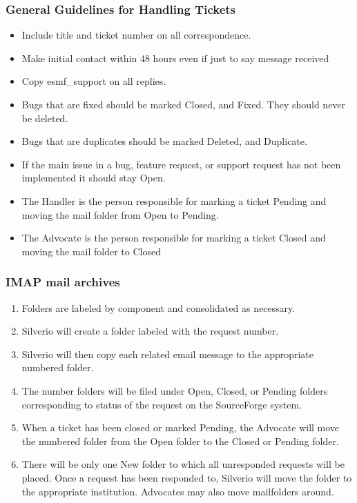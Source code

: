 \subsubsection{General Guidelines for Handling Tickets}
\begin{itemize}
\item Include title and ticket number on all correspondence.
\item Make initial contact within 48 hours even if just to say message received
\item Copy esmf\_support on all replies.
\item Bugs that are fixed should be marked Closed, and Fixed. They should never be deleted. 
\item Bugs that are duplicates should be marked Deleted, and Duplicate. 
\item If the main issue in a bug, feature request, or support request has not been implemented it should stay Open.
\item The Handler is the person responsible for marking a ticket Pending and moving the mail folder from Open to Pending.
\item The Advocate is the person responsible for marking a ticket Closed and moving the mail folder to Closed
\end{itemize}

\subsubsection{IMAP mail archives}
\begin{enumerate}
\item Folders are labeled by component and consolidated as necessary.
\item Silverio will create a folder labeled with the request number. 
\item Silverio will then copy each related email message to the appropriate 
numbered folder. 
\item The number folders will be filed under Open, Closed, or Pending folders 
corresponding to status of the request on the SourceForge system.
\item When a ticket has been closed or marked Pending, the Advocate will move the numbered folder from the Open folder to the Closed or Pending folder.
\item There will be only one New folder to which all unresponded requests will be placed. Once a request has been responded to, Silverio will move the folder to the appropriate institution. Advocates may also move mailfolders around.
\end{enumerate}

